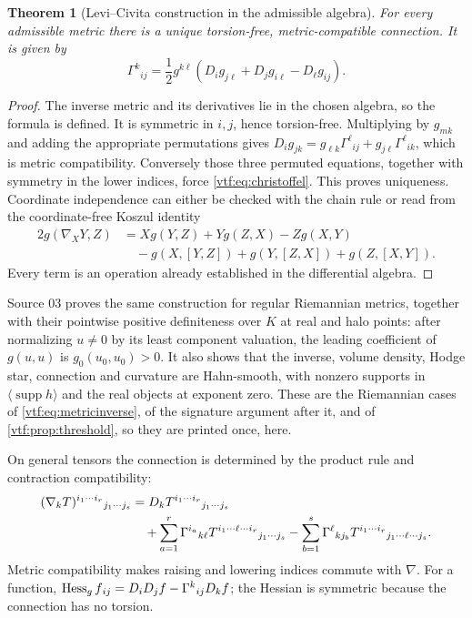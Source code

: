 \documentclass[11pt,letterpaper]{article}
\newtheorem{theorem}{Theorem}[section]
\theoremstyle{definition}
\theoremstyle{remark}
\newcommand{\supp}{\operatorname{supp}}\newcommand{\st}{\operatorname{st}}
\begin{document}
\begin{theorem}[Levi--Civita construction in the admissible algebra]
For every admissible metric there is a unique torsion-free, metric-compatible
connection. It is given by
\begin{equation}\label{vtf:eq:christoffel}
 \Gamma^k{}_{ij}=\frac12g^{k\ell}
 (D_i g_{j\ell}+D_j g_{i\ell}-D_\ell g_{ij}).
\end{equation}
\end{theorem}
\begin{proof}
The inverse metric and its derivatives lie in the chosen algebra, so the
formula is defined. It is symmetric in $i,j$, hence torsion-free. Multiplying
by $g_{mk}$ and adding the appropriate permutations gives
$D_i g_{jk}=g_{\ell k}\Gamma^\ell{}_{ij}
+g_{j\ell}\Gamma^\ell{}_{ik}$, which is metric compatibility.
Conversely those three permuted equations, together with symmetry in the
lower indices, force \eqref{vtf:eq:christoffel}. This proves uniqueness.
Coordinate independence can either be checked with the chain rule or read
from the coordinate-free Koszul identity
\begin{align*}
 2g(\nabla_XY,Z)&=Xg(Y,Z)+Yg(Z,X)-Zg(X,Y)\\
 &\quad-g(X,[Y,Z])+g(Y,[Z,X])+g(Z,[X,Y]).
\end{align*}
Every term is an operation already established in the differential algebra.
\end{proof}

Source 03 proves the same construction for regular Riemannian metrics, together
with their pointwise positive definiteness over $K$ at real and halo points:
after normalizing $u\ne0$ by its least component valuation, the leading
coefficient of $g(u,u)$ is $g_0(u_0,u_0)>0$. It also shows that the inverse,
volume density, Hodge star, connection and curvature are Hahn-smooth, with
nonzero supports in $\langle\supp h\rangle$ and the real objects at exponent
zero. These are the Riemannian cases of \eqref{vtf:eq:metricinverse}, of the
signature argument after it, and of \cref{vtf:prop:threshold}, so they are
printed once, here.

On general tensors the connection is determined by the product rule and
contraction compatibility:
\begin{align}\label{vtf:eq:covtensor}
 (\nabla_kT)^{i_1\cdots i_r}{}_{j_1\cdots j_s}
 &=D_kT^{i_1\cdots i_r}{}_{j_1\cdots j_s}\notag\\
 &\quad+\sum_{a=1}^r\Gamma^{i_a}{}_{k\ell}
 T^{i_1\cdots\ell\cdots i_r}{}_{j_1\cdots j_s}
 -\sum_{b=1}^s\Gamma^\ell{}_{kj_b}
 T^{i_1\cdots i_r}{}_{j_1\cdots\ell\cdots j_s}.
\end{align}
Metric compatibility makes raising and lowering indices commute with
$\nabla$. For a function,
$\operatorname{Hess}_g f{}_{ij}=D_iD_jf-\Gamma^k{}_{ij}D_kf$; the Hessian is symmetric
because the connection has no torsion.
\end{document}
